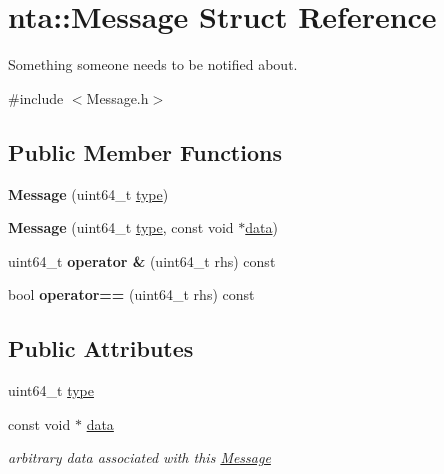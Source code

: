 \hypertarget{structnta_1_1Message}{}\section{nta\+:\+:Message Struct Reference}
\label{structnta_1_1Message}


Something someone needs to be notified about.  




{\ttfamily \#include $<$Message.\+h$>$}

\subsection*{Public Member Functions}
\begin{DoxyCompactItemize}
\item 
\mbox{\label{structnta_1_1Message_adf6da023ce23b9e2cb13adeb88a65e57}} 
{\bfseries Message} (uint64\+\_\+t \hyperlink{structnta_1_1Message_a512ef14eaa86f830247f8194cbbd4f83}{type})
\item 
\mbox{\label{structnta_1_1Message_a9242b844faf05c3824c66a52da675cf7}} 
{\bfseries Message} (uint64\+\_\+t \hyperlink{structnta_1_1Message_a512ef14eaa86f830247f8194cbbd4f83}{type}, const void $\ast$\hyperlink{structnta_1_1Message_acdc6a80330922946fc6b8657602e43a0}{data})
\item 
\mbox{\label{structnta_1_1Message_ad3c8c3c148cccb68e091bfcb978e56d7}} 
uint64\+\_\+t {\bfseries operator \&} (uint64\+\_\+t rhs) const
\item 
\mbox{\label{structnta_1_1Message_acdb294b8fafb2ad616c7b947a95a6d7d}} 
bool {\bfseries operator==} (uint64\+\_\+t rhs) const
\end{DoxyCompactItemize}
\subsection*{Public Attributes}
\begin{DoxyCompactItemize}
\item 
uint64\+\_\+t \hyperlink{structnta_1_1Message_a512ef14eaa86f830247f8194cbbd4f83}{type}
\item 
\mbox{\label{structnta_1_1Message_acdc6a80330922946fc6b8657602e43a0}} 
const void $\ast$ \hyperlink{structnta_1_1Message_acdc6a80330922946fc6b8657602e43a0}{data}
\begin{DoxyCompactList}\small\item\em arbitrary data associated with this \hyperlink{structnta_1_1Message}{Message} \end{DoxyCompactList}\end{DoxyCompactItemize}


